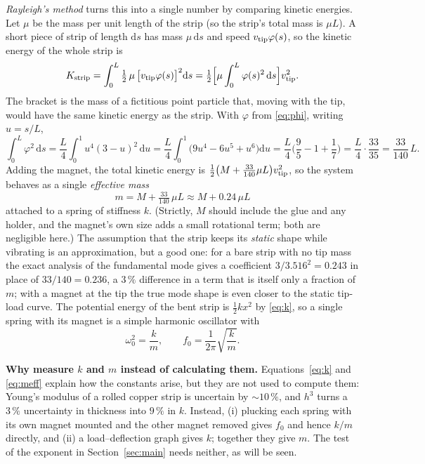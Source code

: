 \documentclass[11pt,a4paper]{article}
\newcommand{\dd}{\mathrm{d}}
\begin{document}
\emph{Rayleigh's method} turns this into a single number by comparing kinetic energies. Let $\mu$ be the mass per unit length of the strip (so the strip's total mass is $\mu L$). A short piece of strip of length $\dd s$ has mass $\mu\,\dd s$ and speed $v_{\rm tip}\varphi(s)$, so the kinetic energy of the whole strip is
\begin{equation}
K_{\rm strip}=\int_0^L\tfrac12\,\mu\,\big[v_{\rm tip}\varphi(s)\big]^2\dd s
=\tfrac12\Big[\mu\int_0^L\varphi(s)^2\,\dd s\Big]v_{\rm tip}^2 .
\end{equation}
The bracket is the mass of a fictitious point particle that, moving with the tip, would have the same kinetic energy as the strip. With $\varphi$ from \eqref{eq:phi}, writing $u=s/L$,
\begin{equation}
\int_0^L\varphi^2\,\dd s=\frac{L}{4}\int_0^1u^4(3-u)^2\,\dd u
=\frac{L}{4}\int_0^1\big(9u^4-6u^5+u^6\big)\dd u
=\frac{L}{4}\Big(\frac95-1+\frac17\Big)=\frac{L}{4}\cdot\frac{33}{35}=\frac{33}{140}\,L .
\end{equation}
Adding the magnet, the total kinetic energy is $\tfrac12\big(M+\tfrac{33}{140}\mu L\big)v_{\rm tip}^2$, so the system behaves as a single \emph{effective mass}
\begin{equation}
\boxed{\;m=M+\tfrac{33}{140}\,\mu L\approx M+0.24\,\mu L\;}
\label{eq:meff}
\end{equation}
attached to a spring of stiffness $k$. (Strictly, $M$ should include the glue and any holder, and the magnet's own size adds a small rotational term; both are negligible here.) The assumption that the strip keeps its \emph{static} shape while vibrating is an approximation, but a good one: for a bare strip with no tip mass the exact analysis of the fundamental mode gives a coefficient $3/3.516^2=0.243$ in place of $33/140=0.236$, a $3\,\%$ difference in a term that is itself only a fraction of $m$; with a magnet at the tip the true mode shape is even closer to the static tip-load curve. The potential energy of the bent strip is $\tfrac12kx^2$ by \eqref{eq:k}, so a single spring with its magnet is a simple harmonic oscillator with
\begin{equation}
\omega_0^2=\frac{k}{m},\qquad f_0=\frac{1}{2\pi}\sqrt{\frac{k}{m}} .
\label{eq:f0}
\end{equation}

\begin{notebox}
\textbf{Why measure $k$ and $m$ instead of calculating them.} Equations~\eqref{eq:k} and \eqref{eq:meff} explain how the constants arise, but they are not used to compute them: Young's modulus of a rolled copper strip is uncertain by $\sim10\,\%$, and $h^3$ turns a $3\,\%$ uncertainty in thickness into $9\,\%$ in $k$. Instead, (i) plucking each spring with its own magnet mounted and the other magnet removed gives $f_0$ and hence $k/m$ directly, and (ii) a load--deflection graph gives $k$; together they give $m$. The test of the exponent in Section~\ref{sec:main} needs neither, as will be seen.
\end{notebox}
\end{document}
